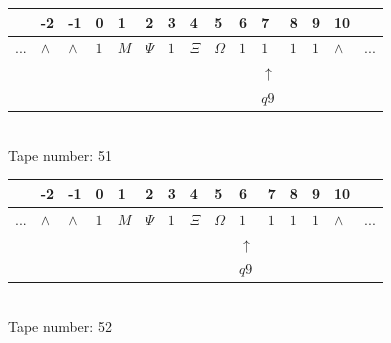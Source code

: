\documentclass[11pt]{article}
\begin{document}
\begin{table}[H]
\centering
\begin{tabular}{lllllllllllllll}
 & -2 & -1 & 0 & 1 & 2 & 3 & 4 & 5 & 6 & 7 & 8 & 9 & 10 & \\
\hline
$...$ & \multicolumn{1}{|l|}{$\wedge$} & \multicolumn{1}{|l|}{$\wedge$} & \multicolumn{1}{|l|}{$1$} & \multicolumn{1}{|l|}{$M$} & \multicolumn{1}{|l|}{$\Psi$} & \multicolumn{1}{|l|}{$1$} & \multicolumn{1}{|l|}{$\Xi$} & \multicolumn{1}{|l|}{$\Omega$} & \multicolumn{1}{|l|}{$1$} & \multicolumn{1}{|l|}{$1$} & \multicolumn{1}{|l|}{$1$} & \multicolumn{1}{|l|}{$1$} & \multicolumn{1}{|l|}{$\wedge$} & $...$\\
\hline
&  &  &  &  &  &  &  &  &  & $\uparrow$ &  &  &  &  \\
&  &  &  &  &  &  &  &  &  & $ q9 $ &  &  &  &  \\
\end{tabular}
\\
Tape number: 51
\noindent\makebox[\linewidth]{\hdashrule{\textwidth}{1pt}{1pt}}\end{table}

\begin{table}[H]
\centering
\begin{tabular}{lllllllllllllll}
 & -2 & -1 & 0 & 1 & 2 & 3 & 4 & 5 & 6 & 7 & 8 & 9 & 10 & \\
\hline
$...$ & \multicolumn{1}{|l|}{$\wedge$} & \multicolumn{1}{|l|}{$\wedge$} & \multicolumn{1}{|l|}{$1$} & \multicolumn{1}{|l|}{$M$} & \multicolumn{1}{|l|}{$\Psi$} & \multicolumn{1}{|l|}{$1$} & \multicolumn{1}{|l|}{$\Xi$} & \multicolumn{1}{|l|}{$\Omega$} & \multicolumn{1}{|l|}{$1$} & \multicolumn{1}{|l|}{$1$} & \multicolumn{1}{|l|}{$1$} & \multicolumn{1}{|l|}{$1$} & \multicolumn{1}{|l|}{$\wedge$} & $...$\\
\hline
&  &  &  &  &  &  &  &  & $\uparrow$ &  &  &  &  &  \\
&  &  &  &  &  &  &  &  & $ q9 $ &  &  &  &  &  \\
\end{tabular}
\\
Tape number: 52
\noindent\makebox[\linewidth]{\hdashrule{\textwidth}{1pt}{1pt}}\end{table}
\end{document}
